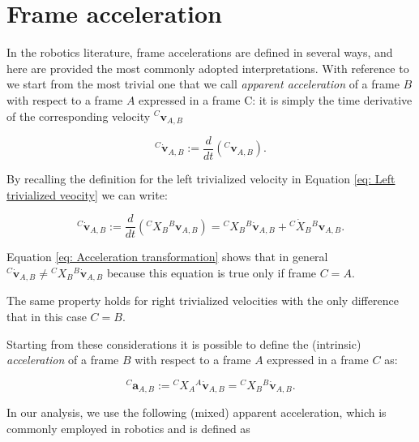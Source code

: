     \section{Frame acceleration}
    \label{sec:Frame acceleration}
    
    In the robotics literature, frame accelerations are defined in several ways, and here are provided the most commonly adopted interpretations. With reference to \cite{Traversaro-Saccon} we start from the most trivial one that we call \textit{apparent acceleration} of a frame $B$ with respect to a frame $A$ expressed in a frame C: it is simply the time derivative of the corresponding velocity ${}^{C} \mathbf{v}_{A,B}$ 

    \begin{equation}
    {}^{C}\dot{ \mathbf{v}}_{A,B} := \frac{d}{dt} ({}^{C} \mathbf{v}_{A,B}).
    \label{eq: Apparent acceleration}
    \end{equation}

    By recalling the definition for the left trivialized velocity in Equation \eqref{eq: Left trivialized veocity} we can write:

    \begin{equation}
    {}^{C}\dot{ \mathbf{v}}_{A,B} := \frac{d}{dt} ({}^{C} {X}_{B}{}^{B} \mathbf{v}_{A,B}) = {}^{C} {X}_{B} {}^{B} {\dot{\mathbf{v}}}_{A,B} + {}^{C} {\dot{X}}_{B}{}^{B} \mathbf{v}_{A,B}.
    \label{eq: Acceleration transformation}
    \end{equation}

    Equation \eqref{eq: Acceleration transformation} shows that in general ${}^{C}\dot{ \mathbf{v}}_{A,B} \neq {}^{C} {X}_{B} {}^{B} {\dot{\mathbf{v}}}_{A,B}$ because this equation is true only if frame $C = A$.
    
    The same property holds for right trivialized velocities with the only difference that in this case $C = B$.

    Starting from these considerations it is possible to define the (intrinsic) \textit{acceleration} of a frame $B$ with respect to a frame $A$ expressed in a frame $C$ as:

    \begin{equation}
    {}^{C} \mathbf{a}_{A,B} := {}^{C} {X}_{A} {}^{A} {\dot{\mathbf{v}}}_{A,B} = {}^{C} {X}_{B}{}^{B} {\dot{\mathbf{v}}}_{A,B}.
    \label{eq: Intrinsic acceleration}
    \end{equation}
 
    In our analysis, we use the following (mixed) apparent acceleration, which is commonly employed in robotics and is defined as

